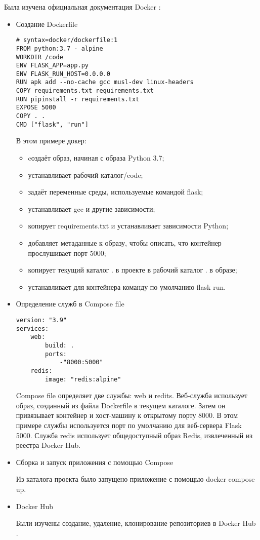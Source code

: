 Была изучена официальная документация Docker \cite{bib2}:
\begin{itemize}
	\item Создание Dockerfile

\begin{lstlisting}[caption={Dockerfile}]
# syntax=docker/dockerfile:1
FROM python:3.7 - alpine
WORKDIR /code
ENV FLASK_APP=app.py
ENV FLASK_RUN_HOST=0.0.0.0
RUN apk add --no-cache gcc musl-dev linux-headers
COPY requirements.txt requirements.txt
RUN pipinstall -r requirements.txt
EXPOSE 5000
COPY . .
CMD ["flask", "run"]
\end{lstlisting}

В этом примере докер:
\begin{itemize}
	\item cоздаёт образ, начиная с образа Python 3.7;
	\item устанавливает рабочий каталог/code;
	\item задаёт переменные среды, используемые командой flask;
	\item устанавливает gcc и другие зависимости;
	\item копирует requirements.txt и устанавливает зависимости Python;
	\item добавляет метаданные к образу, чтобы описать, что контейнер прослушивает порт 5000;
	\item копирует текущий каталог . в проекте в рабочий каталог . в образе;
	\item устанавливает для контейнера команду по умолчанию flask run.
\end{itemize}
	
	\item Определение служб в Compose file
	
	\begin{lstlisting}[caption={Compose file}]
version: "3.9"
services:
	web:
		build: .
		ports:
			-"8000:5000"
	redis:
		image: "redis:alpine"	
	\end{lstlisting}
Compose file определяет две службы: web и redits. Веб-служба использует образ, созданный из файла Dockerfile в текущем каталоге. Затем он привязывает контейнер и хост-машину к открытому порту 8000. В этом примере службы используется порт по умолчанию для веб-сервера Flask 5000. Служба redis использует общедоступный образ Redis, извлеченный из реестра Docker Hub.
	\item Сборка и запуск приложения с помощью Compose
		
	Из каталога проекта было запущено приложение с помощью docker compose up.
	\item Docker Hub
	
	Были изучены создание, удаление, клонирование репозиториев в Docker Hub \cite{bib3}.
\end{itemize}


